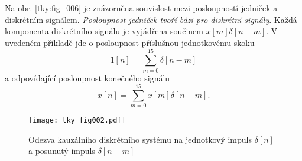       Na obr. \ref{tky:fig_006} je znázorněna souvislost mezi posloupností jedniček a diskrétním
      signálem. \emph{Posloupnost jedniček tvoří bázi pro diskrétní signály}. Každá komponenta
      diskrétního signálu je vyjádřena součinem $x[m]\delta[n-m]$. V uvedeném příkladě jde o
      posloupnost příslušnou jednotkovému skoku
      \begin{equation*}
        1[n]=\sum_{m=0}^{15}\delta[n-m]
      \end{equation*}
      a odpovídající posloupnost konečného signálu
      \begin{equation*}
        x[n]=\sum_{m=0}^{15}x[m]\delta[n-m].
      \end{equation*}

      \begin{figure*}[ht!]
        \centering
        \texttt{[image: tky\_fig002.pdf]}
         \caption[impulsní odezva]{Odezva kauzálního diskrétního systému na jednotkový impuls
                  $\delta[n]$ a posunutý impuls $\delta[n-m]$}
        \label{tky:fig002}
      \end{figure*}

